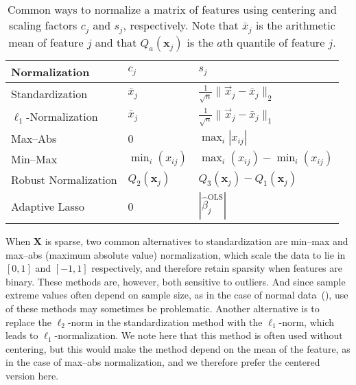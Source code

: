 \begin{table}[hbtp]
  \centering
  \caption{
    Common ways to normalize a matrix of features using centering and scaling
    factors \(c_j\) and \(s_j\), respectively. Note that \(\bar{x}_j\) is
    the arithmetic mean of feature \(j\) and that \(Q_a(\bm{x}_j)\) is the
    \(a\)th quantile of feature \(j\).
  }
  \label{tab:normalization-types}
  \begin{tabular}{lll}
    \toprule
    Normalization            & \(c_{j}\)          & \(s_j\)                                                     \\
    \midrule
    Standardization          & \(\bar{x}_j\)      & \(\frac{1}{\sqrt{n}} \lVert \vec{x}_j - \bar{x}_j\rVert_2\) \\
    \addlinespace
    \(\ell_1\)-Normalization & \(\bar{x}_j\)      & \(\frac{1}{\sqrt{n}} \lVert \vec{x}_j - \bar{x}_j\rVert_1\) \\
    \addlinespace
    Max--Abs                 & 0                  & \(\max_i|x_{ij}|\)                                          \\
    \addlinespace
    Min--Max                 & \(\min_i(x_{ij})\) & \(\max_i(x_{ij}) - \min_i(x_{ij})\)                         \\
    \addlinespace
    Robust Normalization     & \(Q_2(\bm{x}_j)\)  & \(Q_3(\bm{x}_j) - Q_1(\bm{x}_j)\)                           \\
    \addlinespace
    Adaptive Lasso           & 0                  & \(|\hat{\beta}_j^\text{OLS}|\)                              \\
    \bottomrule
  \end{tabular}
\end{table}

When \(\bm{X}\) is sparse, two common alternatives to standardization are min--max and
max--abs (maximum absolute value) normalization, which scale the data to lie in \([0, 1]\)
and \([-1, 1]\) respectively, and therefore retain sparsity when features are binary. These
methods are, however, both sensitive to outliers. And since sample extreme values often
depend on sample size, as in the case of normal data~(), use of
these methods may sometimes be problematic. Another alternative is to replace the
\(\ell_2\)-norm in the standardization method with the \(\ell_1\)-norm, which leads to
\(\ell_1\)-normalization. We note here that this method is often used without centering,
but this would make the method depend on the mean of the feature, as in the case of
max--abs normalization, and we therefore prefer the centered version here.

